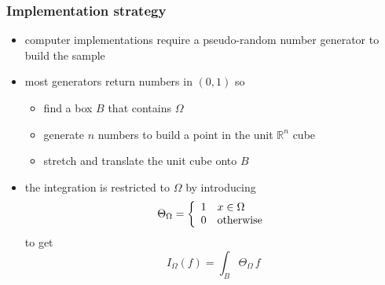 \begin{frame}
%
  \frametitle{Implementation strategy}
%
  \begin{itemize}
%
  \item computer implementations require a pseudo-random number generator to build the sample
%
    \item most generators return numbers in $(0,1)$ so
      \begin{itemize}
      \item find a box $B$ that contains $\Omega$
      \item generate $n$ numbers to build a point in the unit $\mathbb{R}^{n}$ cube
      \item stretch and translate the unit cube onto $B$
      \end{itemize}
%
  \item the integration is restricted to $\Omega$ by introducing
    \begin{equation}
        \Theta_{\Omega}
        =
        \left\{
          \begin{array}{ll}
            1 & x \in \Omega \\
            0 & {\rm otherwise}
          \end{array}
        \right.
        \label{eq:theta}
    \end{equation}
    to get
    \begin{equation}
      I_{\Omega} (f)
      =
      \int_{B} \Theta_{\Omega} \, f
      \label{eq:integral-box}
    \end{equation}
%
  \end{itemize}
%
\end{frame}

